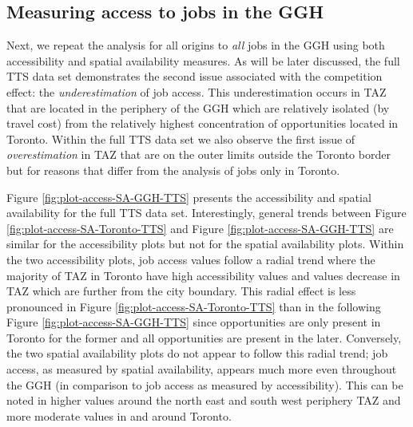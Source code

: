 \documentclass[]{elsarticle} %
\begin{document}
\hypertarget{measuring-access-to-jobs-in-the-ggh}{%
\subsection{Measuring access to jobs in the
GGH}\label{measuring-access-to-jobs-in-the-ggh}}

Next, we repeat the analysis for all origins to \emph{all} jobs in the
GGH using both accessibility and spatial availability measures. As will
be later discussed, the full TTS data set demonstrates the second issue
associated with the competition effect: the \emph{underestimation} of
job access. This underestimation occurs in TAZ that are located in the
periphery of the GGH which are relatively isolated (by travel cost) from
the relatively highest concentration of opportunities located in
Toronto. Within the full TTS data set we also observe the first issue of
\emph{overestimation} in TAZ that are on the outer limits outside the
Toronto border but for reasons that differ from the analysis of jobs
only in Toronto.

Figure \ref{fig:plot-access-SA-GGH-TTS} presents the accessibility and
spatial availability for the full TTS data set. Interestingly, general
trends between Figure \ref{fig:plot-access-SA-Toronto-TTS} and Figure
\ref{fig:plot-access-SA-GGH-TTS} are similar for the accessibility plots
but not for the spatial availability plots. Within the two accessibility
plots, job access values follow a radial trend where the majority of TAZ
in Toronto have high accessibility values and values decrease in TAZ
which are further from the city boundary. This radial effect is less
pronounced in Figure \ref{fig:plot-access-SA-Toronto-TTS} than in the
following Figure \ref{fig:plot-access-SA-GGH-TTS} since opportunities
are only present in Toronto for the former and all opportunities are
present in the later. Conversely, the two spatial availability plots do
not appear to follow this radial trend; job access, as measured by
spatial availability, appears much more even throughout the GGH (in
comparison to job access as measured by accessibility). This can be
noted in higher values around the north east and south west periphery
TAZ and more moderate values in and around Toronto.
\end{document}

